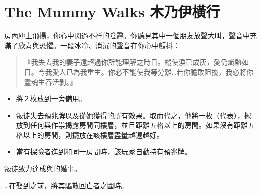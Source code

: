 
\chapter{The Mummy Walks 木乃伊橫行}

\begin{HauntStory}
  房內塵土飛揚，你心中閃過不祥的陰霾。你聽見其中一個朋友放聲大叫，聲音中充滿了欣喜與恐懼。一段冰冷、消沉的聲音在你心中顫抖：
  \begin{quote}
    『我失去我的妻子遠超過你所能理解之時日。縱使淚已成灰，愛仍熾熱如日。今我愛人已為我重生。你必不能使我等分離…若你膽敢阻擾，我必將你靈魂生吞活剝。』
  \end{quote}
\end{HauntStory}

\vspace*{-1em}
\begin{itemize}
  \item 將２枚放到一旁備用。
  \item 叛徒失去預兆牌以及從她獲得的所有效果。取而代之，他將一枚（代表），擺放到任何與作祟揭露房間同樓層，並且距離五格以上的房間。如果沒有距離五格以上的房間，則擺放在該樓層盡量越遠越好。
  \item 當有探險者進到和同一房間時，該玩家自動持有預兆牌。
\end{itemize}

叛徒致力達成與的婚事。

…在娶到之前，將其驅散回亡者之國時。

\vfill\null\pagebreak

